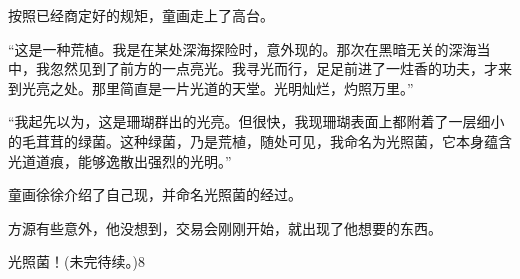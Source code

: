 \begin{this_body}
按照已经商定好的规矩，童画走上了高台。

“这是一种荒植。我是在某处深海探险时，意外现的。那次在黑暗无关的深海当中，我忽然见到了前方的一点亮光。我寻光而行，足足前进了一炷香的功夫，才来到光亮之处。那里简直是一片光道的天堂。光明灿烂，灼照万里。”

“我起先以为，这是珊瑚群出的光亮。但很快，我现珊瑚表面上都附着了一层细小的毛茸茸的绿菌。这种绿菌，乃是荒植，随处可见，我命名为光照菌，它本身蕴含光道道痕，能够逸散出强烈的光明。”

童画徐徐介绍了自己现，并命名光照菌的经过。

方源有些意外，他没想到，交易会刚刚开始，就出现了他想要的东西。

光照菌！(未完待续。)8

\end{this_body}


